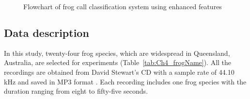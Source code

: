 \begin{figure}[htb!] %
\caption{Flowchart of frog call classification system using enhanced features}
\label{fig:Ch4_flowchart} 
\end{figure}


\subsection{Data description}
In this study, twenty-four frog species, which are widespread in Queensland, Australia, are selected for experiments (Table~\ref{tab:Ch4_frogName}). All the recordings are obtained from David Stewart's CD with a sample rate of 44.10 kHz and saved in MP3 format \citep{CD}. Each recording includes one frog species with the duration ranging from eight to fifty-five seconds.

